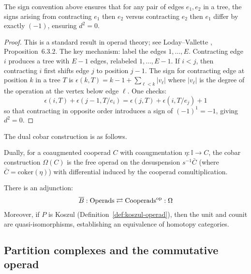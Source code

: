 \begin{lemma}\label{lem:sign-consistency-bar}
The sign convention above ensures that for any pair of edges $e_1, e_2$ in a tree, the signs arising from contracting $e_1$ then $e_2$ versus contracting $e_2$ then $e_1$ differ by exactly $(-1)$, ensuring $d^2 = 0$.
\end{lemma}

\begin{proof}
This is a standard result in operad theory; see Loday--Vallette \cite{LodayVallette}, Proposition~6.3.2.  The key mechanism: label the edges $1, \ldots, E$.  Contracting edge $i$ produces a tree with $E-1$ edges, relabeled $1, \ldots, E-1$.  If $i < j$, then contracting $i$ first shifts edge $j$ to position $j-1$.  The sign for contracting edge at position $k$ in a tree $T$ is $\epsilon(k,T) = k - 1 + \sum_{\ell < k} |v_\ell|$ where $|v_\ell|$ is the degree of the operation at the vertex below edge $\ell$.  One checks:
\[\epsilon(i, T) + \epsilon(j-1, T/e_i) = \epsilon(j, T) + \epsilon(i, T/e_j) + 1\]
so that contracting in opposite order introduces a sign of $(-1)^1 = -1$, giving $d^2 = 0$.
\end{proof}

The dual cobar construction is as follows.

\begin{definition}
Dually, for a coaugmented cooperad $C$ with coaugmentation $\eta : \mathbb{I} \to C$, the cobar construction $\Omega(C)$ is the free operad on the desuspension $s^{-1}\bar{C}$ (where $\bar{C} = \text{coker}(\eta)$) with differential induced by the cooperad comultiplication.
\end{definition}
 
\begin{theorem}\label{thm:bar-cobar-adjunction-operadic}
There is an adjunction:
\[
\overline{B} : \text{Operads} \rightleftarrows \text{Cooperads}^{\text{op}} : \Omega
\]
Moreover, if $P$ is Koszul (Definition~\ref{def:koszul-operad}), then the unit and counit are quasi-isomorphisms, establishing an equivalence of homotopy categories.
\end{theorem}
 
\subsection{Partition complexes and the commutative operad}
 
